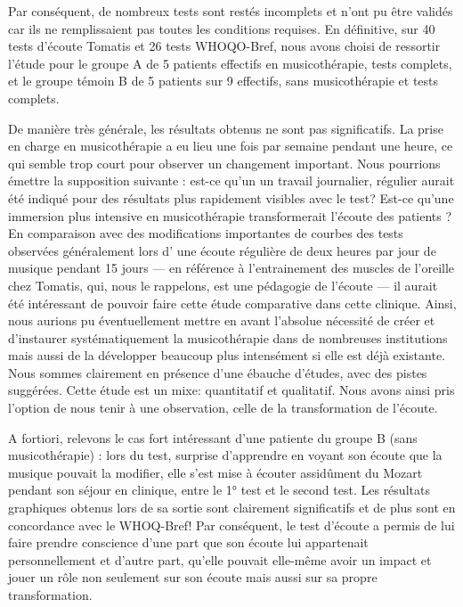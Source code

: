 Par conséquent,  de nombreux tests sont restés 
incomplets et n'ont pu
être validés car ils ne remplissaient pas toutes les conditions requises.  En définitive, sur 40 tests d'écoute Tomatis et 26 tests
WHOQO-Bref, nous avons choisi de ressortir l'étude pour le groupe A de
5 patients effectifs en musicothérapie, tests complets, et le groupe
témoin B de 5 patients sur 9 effectifs, sans musicothérapie et tests
complets. 
 

  

  
  De manière très générale, les résultats obtenus ne
  sont pas significatifs.  La prise en charge en musicothérapie a eu lieu
  une fois par semaine pendant une heure, ce qui semble trop court pour observer un changement important. Nous pourrions émettre la supposition suivante :  est-ce qu'un un travail journalier, régulier aurait été indiqué pour des résultats plus rapidement visibles avec le test?
  Est-ce qu'une immersion plus intensive en musicothérapie transformerait l'écoute des patients ? 
   En comparaison avec des
  modifications importantes de courbes des tests observées généralement  lors d' une écoute
  régulière de deux heures par jour de musique pendant 15 jours --- en référence à l'entrainement des muscles de l'oreille chez Tomatis, qui, nous le rappelons, est une pédagogie de l'écoute --- il aurait été intéressant de pouvoir faire cette étude comparative dans cette clinique. Ainsi, nous aurions pu éventuellement mettre en avant  l'absolue nécessité de créer et d'instaurer systématiquement la musicothérapie dans de nombreuses institutions mais aussi  de la développer beaucoup plus intensément  si elle est déjà existante.
  Nous sommes clairement en présence d'une ébauche d'études, avec des pistes
  suggérées. 
  Cette étude est un mixe: quantitatif et qualitatif. Nous avons ainsi pris l'option de nous tenir à une
  observation, celle de la transformation de l'écoute.
  
  A fortiori, relevons le cas fort intéressant  d'une patiente du groupe B (sans
  musicothérapie) : lors du test, surprise d'apprendre en voyant son écoute que la musique pouvait la modifier, elle s'est mise à écouter assidûment du Mozart pendant son séjour en clinique, entre le 1° test et le second test.  Les résultats
  graphiques obtenus lors de sa sortie sont clairement significatifs
  et de plus sont en concordance avec le WHOQ-Bref!  
  Par conséquent, le test d'écoute a permis de lui faire prendre conscience d'une part que son écoute lui appartenait personnellement et d'autre part, qu'elle pouvait elle-même avoir un impact et jouer un rôle non seulement sur son écoute mais aussi sur sa propre  transformation.



